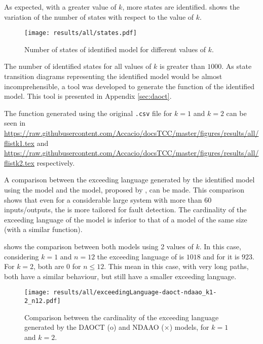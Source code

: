 As expected, with a greater value of $k$, more states are identified. 
 shows the variation of the number of
states with respect to the value of $k$.
\begin{figure}[H]
  \centering
  \texttt{[image: results/all/states.pdf]}
  \caption{Number of states of identified model for different values of $k$.}
    \label{fig:statesIdentOriginal}
\end{figure}

The number of identified states for all values of $k$ is greater than $1000$. As
state transition diagrams representing the identified model would be almost
incomprehensible, a tool was developed to generate the \ffunction{} function of
the identified model. This tool is presented in Appendix \ref{sec:daoct}.

The \ffunction{} function generated using the original \verb|.csv| file
for $k=1$ and $k=2$
can be seen in  
\url{https://raw.githubusercontent.com/Accacio/docsTCC/master/figures/results/all/flistk1.tex}
and
\url{https://raw.githubusercontent.com/Accacio/docsTCC/master/figures/results/all/flistk2.tex}
respectively.

A comparison between the exceeding language generated by the
identified model using the \DAOCT{} model and the \NDAAO{} model, proposed by
\cite{klein2005fault}, can be made. This comparison shows that even for a considerable
large system with more than 60 inputs\slash outputs, the \DAOCT{} is more
tailored for fault detection. The cardinality of the exceeding language of the
\DAOCT{} model is
inferior to that of a \NDAAO{} model of the same size (with a similar \ffunction{} function).

 shows the comparison between both models using 2 values of $k$.
In this case, considering $k=1$ and $n=12$ the
exceeding language of \NDAAO{} is $1018$ and for \DAOCT{} it is $923$. For $k=2$, both are $0$ for $n\leq12$. This mean in this case, with very
long paths, both have a similar behaviour, but \DAOCT{} still have a smaller
exceeding language.

\begin{figure}[H]
  \centering
  \texttt{[image: results/all/exceedingLanguage-daoct-ndaao\_k1-2\_n12.pdf]}
  \caption[Comparison between the cardinality of the exceeding language generated by the DAOCT and
NDAAO.]{Comparison between the cardinality of the exceeding language generated by the DAOCT (o) and
NDAAO ($\times$) models, for $k=1$ and $k=2$.}
    \label{fig:daoctNdaaoOriginal}
\end{figure}

